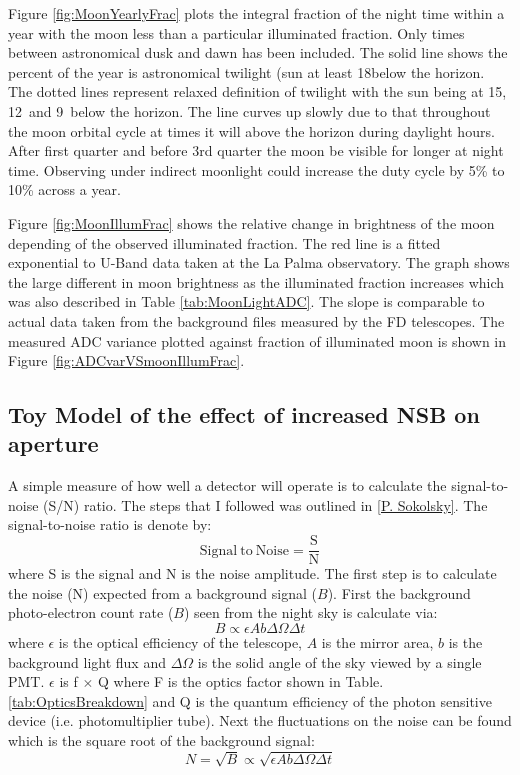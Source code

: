 Figure \ref{fig:MoonYearlyFrac} plots the integral fraction of the night time within a year with the moon less than a particular illuminated fraction. Only times between astronomical dusk and dawn has been included. The solid line shows the percent of the year is astronomical twilight (sun at least 18\textdegree below the horizon. The dotted lines represent relaxed definition of twilight with the sun being at 15\textdegree , 12\textdegree \ and 9\textdegree \ below the horizon. The line curves up slowly due to that throughout the moon orbital cycle at times it will above the horizon during daylight hours. After first quarter and before 3rd quarter the moon be visible for longer at night time. Observing under indirect moonlight could increase the duty cycle by 5\% to 10\% across a year.


Figure \ref{fig:MoonIllumFrac} shows the relative change in brightness of the moon depending of the observed illuminated fraction. The red line is a fitted exponential to U-Band data taken at the La Palma observatory. The graph shows the large different in moon brightness as the illuminated fraction increases which was also described in Table \ref{tab:MoonLightADC}. The slope is comparable to actual data taken from the background files measured by the FD telescopes. The measured ADC variance plotted against fraction of illuminated moon is shown in Figure \ref{fig:ADCvarVSmoonIllumFrac}.


\subsection{Toy Model of the effect of increased NSB on aperture}

A simple measure of how well a detector will operate is to calculate the signal-to-noise (S/N) ratio. The steps that I followed was outlined in \ref{P. Sokolsky}. The signal-to-noise ratio is denote by:
\begin{equation}
\mathrm{Signal \ to \ Noise} = \frac{\mathrm{S}}{\mathrm{N}} \label{eq:SNratio}
\end{equation}
where S is the signal and N is the noise amplitude. The first step is to calculate the noise (N) expected from a background signal ($B$). First the background photo-electron count rate ($B$) seen from the night sky is calculate via:
\begin{equation}
B \propto \epsilon A b \Delta \Omega \Delta t \nonumber
\end{equation}
where $\epsilon$ is the optical efficiency of the telescope, $A$ is the mirror area, $b$ is the background light flux and $\Delta\Omega$ is the solid angle of the sky viewed by a single PMT. $\epsilon$ is f $\times$ Q where F is the optics factor shown in Table. \ref{tab:OpticsBreakdown} and Q is the quantum efficiency of the photon sensitive device (i.e. photomultiplier tube). Next the fluctuations on the noise can be found which is the square root of the background signal:
\begin{equation}
N = \sqrt{B} \propto \sqrt{\epsilon A b \Delta \Omega \Delta t} \label{eq:DetectNoise}
\end{equation}

